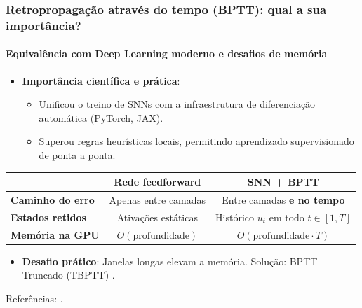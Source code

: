 \begin{frame}
	\frametitle{Retropropagação através do tempo (BPTT): qual a sua importância?}
	\framesubtitle{Equivalência com Deep Learning moderno e desafios de memória}
	\small
	\begin{itemize}
		\item \textbf{Importância científica e prática}:
		\begin{itemize}
			\item Unificou o treino de SNNs com a infraestrutura de diferenciação automática (PyTorch, JAX).
			\item Superou regras heurísticas locais, permitindo aprendizado supervisionado de ponta a ponta.
		\end{itemize}
	\end{itemize}
	\begin{center}
		\footnotesize
		\begin{tabular}{lcc}
			\toprule
			& \textbf{Rede feedforward} & \textbf{SNN + BPTT} \\
			\midrule
			\textbf{Caminho do erro} & Apenas entre camadas & Entre camadas \textbf{e no tempo} \\
			\textbf{Estados retidos} & Ativações estáticas & Histórico $u_t$ em todo $t \in [1, T]$ \\
			\textbf{Memória na GPU} & $O(\text{profundidade})$ & $O(\text{profundidade} \cdot T)$ \\
			\bottomrule
		\end{tabular}
	\end{center}
	\begin{itemize}
		\item \textbf{Desafio prático}: Janelas longas elevam a memória. Solução: BPTT Truncado (TBPTT) \cite{eshraghian2023training}.
	\end{itemize}
	\par\vfill{\tiny Referências: \cite{wu2018spatio, eshraghian2023training}.}
\end{frame}
